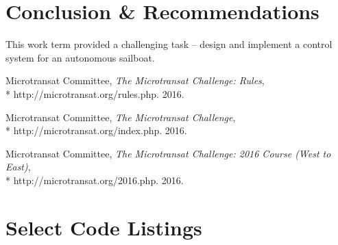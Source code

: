 \documentclass[12pt]{article}
\begin{document}
\clearpage

\section{Conclusion \& Recommendations}
This work term provided a challenging task -- design and implement a control system for an autonomous sailboat. 

\clearpage

\begin{thebibliography}{9}
	Microtransat Committee,
	\emph{The Microtransat Challenge: Rules},\\*
	http://microtransat.org/rules.php.
	2016.
	
	Microtransat Committee,
	\emph{The Microtransat Challenge},\\*
	http://microtransat.org/index.php.
	2016.
	
	Microtransat Committee,
	\emph{The Microtransat Challenge: 2016 Course (West to East)},\\*
	http://microtransat.org/2016.php.
	2016.
	
\end{thebibliography}

\clearpage

\appendix
\section{Select Code Listings}





\clearpage



\clearpage



\clearpage


\end{document}

